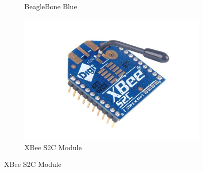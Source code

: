 \begin{figure}[H]
\begin{subfigure}[t]{0.32\textwidth}
    \captionsetup{width=\textwidth}
    \caption{BeagleBone Blue}
    \label{fig:beagleboneBlue}
  \end{subfigure}
  \begin{subfigure}[t]{0.32\textwidth}
    \includegraphics[width=1\textwidth]{figs/img/Xbee-S2C-Module}
    \captionsetup{width=\textwidth}
    \caption{XBee S2C Module}
    \label{fig:XBeeModule}
  \end{subfigure}
\end{figure}

